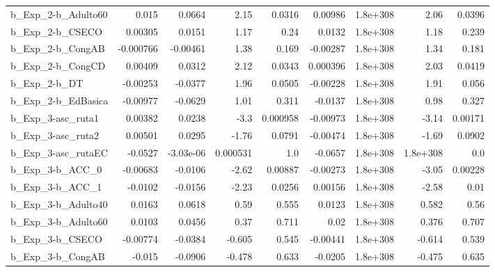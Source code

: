 \begin{tabular}{lrrrrrrrr}
b\_Exp\_2-b\_Adulto60           &       0.015 &       0.0664 &      2.15 &   0.0316 &    0.00986 &    1.8e+308 &         2.06 &        0.0396 \\
b\_Exp\_2-b\_CSECO              &     0.00305 &       0.0151 &      1.17 &     0.24 &     0.0132 &    1.8e+308 &         1.18 &         0.239 \\
b\_Exp\_2-b\_CongAB             &   -0.000766 &     -0.00461 &      1.38 &    0.169 &   -0.00287 &    1.8e+308 &         1.34 &         0.181 \\
b\_Exp\_2-b\_CongCD             &     0.00409 &       0.0312 &      2.12 &   0.0343 &   0.000396 &    1.8e+308 &         2.03 &        0.0419 \\
b\_Exp\_2-b\_DT                 &    -0.00253 &      -0.0377 &      1.96 &   0.0505 &   -0.00228 &    1.8e+308 &         1.91 &         0.056 \\
b\_Exp\_2-b\_EdBasica           &    -0.00977 &      -0.0629 &      1.01 &    0.311 &    -0.0137 &    1.8e+308 &         0.98 &         0.327 \\
b\_Exp\_3-asc\_ruta1            &     0.00382 &       0.0238 &      -3.3 & 0.000958 &   -0.00973 &    1.8e+308 &        -3.14 &       0.00171 \\
b\_Exp\_3-asc\_ruta2            &     0.00501 &       0.0295 &     -1.76 &   0.0791 &   -0.00474 &    1.8e+308 &        -1.69 &        0.0902 \\
b\_Exp\_3-asc\_rutaEC           &     -0.0527 &    -3.03e-06 &  0.000531 &      1.0 &    -0.0657 &    1.8e+308 &     1.8e+308 &           0.0 \\
b\_Exp\_3-b\_ACC\_0              &    -0.00683 &      -0.0106 &     -2.62 &  0.00887 &   -0.00273 &    1.8e+308 &        -3.05 &       0.00228 \\
b\_Exp\_3-b\_ACC\_1              &     -0.0102 &      -0.0156 &     -2.23 &   0.0256 &    0.00156 &    1.8e+308 &        -2.58 &          0.01 \\
b\_Exp\_3-b\_Adulto40           &      0.0163 &       0.0618 &      0.59 &    0.555 &     0.0123 &    1.8e+308 &        0.582 &          0.56 \\
b\_Exp\_3-b\_Adulto60           &      0.0103 &       0.0456 &      0.37 &    0.711 &       0.02 &    1.8e+308 &        0.376 &         0.707 \\
b\_Exp\_3-b\_CSECO              &    -0.00774 &      -0.0384 &    -0.605 &    0.545 &   -0.00441 &    1.8e+308 &       -0.614 &         0.539 \\
b\_Exp\_3-b\_CongAB             &      -0.015 &      -0.0906 &    -0.478 &    0.633 &    -0.0205 &    1.8e+308 &       -0.475 &         0.635 \\

\end{tabular}
